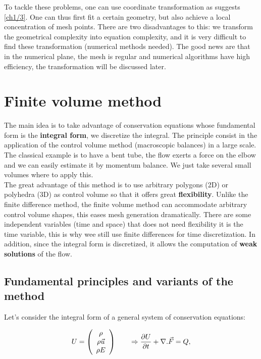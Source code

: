 
To tackle these problems, one can use coordinate transformation as suggests \autoref{ch1/3}. One can thus first fit a certain geometry, but also achieve a local concentration of mesh points. There are two disadvantages to this: we transform the geometrical complexity into equation complexity, and it is very difficult to find these transformation (numerical methods needed). The good news are that in the numerical plane, the mesh is regular and numerical algorithms have high efficiency, the transformation will be discussed later.


\section{Finite volume method}
The main idea is to take advantage of conservation equations whose fundamental form is the \textbf{integral form}, we discretize the integral. The principle consist in the application of the control volume method (macroscopic balances) in a large scale. The classical example is to have a bent tube, the flow exerts a force on the elbow and we can easily estimate it by momentum balance. We just take several small volumes where to apply this. \\

The great advantage of this method is to use arbitrary polygons (2D) or polyhedra (3D) as control volume so that it offers great \textbf{flexibility}. Unlike the finite difference method, the finite volume method can accommodate arbitrary control volume shapes, this eases mesh generation dramatically. There are some independent variables (time and space) that does not need flexibility it is the time variable, this is why wee still use finite differences for time discretization. In addition, since the integral form is discretized, it allows the computation of \textbf{weak solutions} of the flow.

\subsection{Fundamental principles and variants of the method}
Let's consider the integral form of a general system of conservation equations: 

\begin{equation}
U = \left(
\begin{array}{c}
\rho \\
\rho \vec{u}\\
\rho E
\end{array}
 \right)
\qquad \Rightarrow \frac{\partial U}{\partial t} + \nabla . \vec{F} = Q,
\end{equation} 

